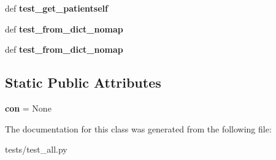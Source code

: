 \begin{DoxyCompactItemize}
\item 
\hypertarget{classtests_1_1test__all_1_1main__test_ad0cabcd246dc3e4ad755ea7abcb86093}{def {\bfseries test\-\_\-get\-\_\-patientself}}\label{classtests_1_1test__all_1_1main__test_ad0cabcd246dc3e4ad755ea7abcb86093}

\item 
\hypertarget{classtests_1_1test__all_1_1main__test_a41e033e5f42465b4a367c169a75ffccc}{def {\bfseries test\-\_\-from\-\_\-dict\-\_\-nomap}}\label{classtests_1_1test__all_1_1main__test_a41e033e5f42465b4a367c169a75ffccc}

\item 
\hypertarget{classtests_1_1test__all_1_1main__test_a41e033e5f42465b4a367c169a75ffccc}{def {\bfseries test\-\_\-from\-\_\-dict\-\_\-nomap}}\label{classtests_1_1test__all_1_1main__test_a41e033e5f42465b4a367c169a75ffccc}

\end{DoxyCompactItemize}
\subsection*{Static Public Attributes}
\begin{DoxyCompactItemize}
\item 
\hypertarget{classtests_1_1test__all_1_1main__test_ae8735aafa7bd854fb2d057d8e94a643b}{{\bfseries con} = None}\label{classtests_1_1test__all_1_1main__test_ae8735aafa7bd854fb2d057d8e94a643b}

\end{DoxyCompactItemize}


The documentation for this class was generated from the following file\-:\begin{DoxyCompactItemize}
\item 
tests/test\-\_\-all.\-py\end{DoxyCompactItemize}
